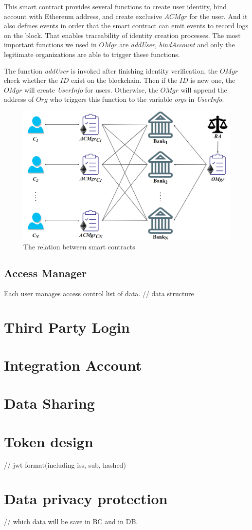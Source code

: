 This smart contract provides several functions to create user identity, bind account with Ethereum address, and create exclusive \(ACMgr\) for the user. And it also defines events in order that the smart contract can emit events to record logs on the block. That enables traceability of identity creation processes. The most important functions we used in \(OMgr\) are \textit{addUser}, \textit{bindAccount} and only the legitimate organizations are able to trigger these functions.\par 
The function \textit{addUser} is invoked after finishing identity verification, the \(OMgr\) check whether the \(ID\) exist on the blockchain. Then if the \(ID\) is new one, the \(OMgr\) will create \textit{UserInfo} for users. Otherwise, the \(OMgr\) will append the address of \(Org\) who triggers this function to the variable \textit{orgs} in \textit{UserInfo}.

\begin{figure}[hb]
    \centering
    \includegraphics[height=!,width=0.8\linewidth,keepaspectratio=true]{figures/smart_contract_deployment.png}
    \caption{{\footnotesize The relation between smart contracts}}
    \label{fig:smart_contract_deployment}
\end{figure}

\subsection*{Access Manager}
Each user manages access control list of data.
// data structure

\section{Third Party Login}
\section{Integration Account}
\section{Data Sharing}
\section{Token design}
// jwt format(including iss, sub, hashed)
\section{Data privacy protection}
// which data will be save in BC and in DB.